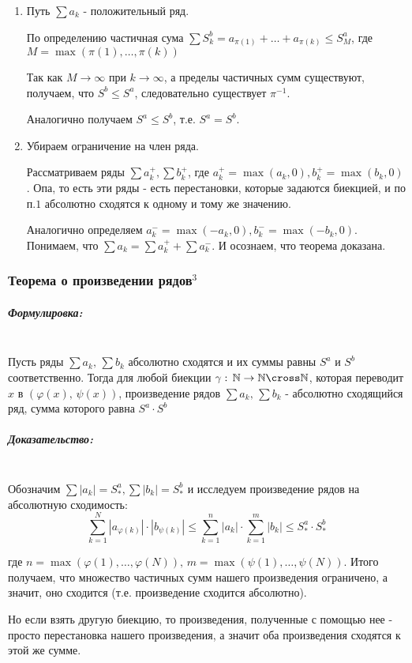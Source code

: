 \documentclass{article}
\let\vanillasubparagraph\subparagraph
\renewcommand{\subparagraph}[1]{\vanillasubparagraph{#1}\mbox{}\\}
\begin{document}
\begin{enumerate}
    \item Путь $\sum a_k$ - положительный ряд. 

        По определению частичная сума $\sum S_k^b = a_{\pi(1)} + \ldots + a_{\pi(k)} \leq S_M^a$, где $M = \max{(\pi(1), \ldots, \pi(k))}$

        Так как $M \to \infty$ при $k \to \infty$, а пределы частичных сумм существуют, получаем, что $S^b \leq S^a$, следовательно существует $\pi^{-1}$. 
        
        Аналогично получаем $S^a \leq S^b$, т.е. $S^a = S^b$.
    \item Убираем ограничение на член ряда. 

        Рассматриваем ряды $\sum a_k^+, \sum b_k^+$, где $a_k^+ = \max{(a_k, 0)}, b_k^+ = \max{(b_k, 0)}$. Опа, то есть эти ряды - есть перестановки, которые задаются биекцией, и по п.$1$ абсолютно сходятся к одному и тому же значению. 

        Аналогично определяем $a_k^- = \max{(-a_k, 0)}, b_k^- = \max{(-b_k, 0)}$. Понимаем, что $\sum a_k = \sum a_k^+ + \sum a_k^-$. И осознаем, что теорема доказана.
\end{enumerate}

\subsubsection{Теорема о произведении рядов\texorpdfstring{$^3$}{}}

\subparagraph{Формулировка: }
Пусть ряды $\sum a_k, \, \sum b_k$ абсолютно сходятся и их суммы равны $S^a$ и $S^b$ соответственно. Тогда для любой биекции $\gamma:\, \mathbb N \to \mathbb N \cross \mathbb N$, которая переводит $x$ в $(\varphi(x),\, \psi(x))$, произведение рядов $\sum a_k, \, \sum b_k$ - абсолютно сходящийся ряд, сумма которого равна $S^a \cdot S^b$

\subparagraph{Доказательство: }
Обозначим $\sum|a_k| = S_*^a, \sum |b_k| = S_*^b$ и исследуем произведение рядов на абсолютную сходимость:
$$
\sum_{k=1}^N |a_{\varphi(k)}| \cdot |b_{\psi(k)}| \leq \sum_{k=1}^n |a_k| \cdot \sum_{k=1}^m |b_k| \leq S_*^a \cdot  S_*^b
$$

где $n = \max{(\varphi(1), \ldots , \varphi(N))},\, m = \max{(\psi(1), \ldots , \psi(N))}$. Итого получаем, что множество частичных сумм нашего произведения ограничено, а значит, оно сходится (т.е. произведение сходится абсолютно).

Но если взять другую биекцию, то произведения, полученные с помощью нее - просто перестановка нашего произведения, а значит оба произведения сходятся к этой же сумме. 
\end{document}
